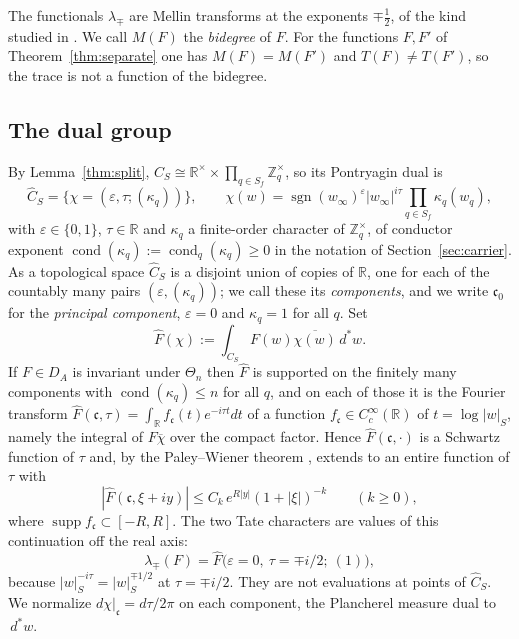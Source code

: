 \documentclass[11pt]{amsart}
\theoremstyle{definition}
\theoremstyle{remark}
\newcommand{\R}{\mathbb R}
\newcommand{\Z}{\mathbb Z}
\newcommand{\dstar}{\,d^{*}}
\newcommand{\supp}{\operatorname{supp}}
\newcommand{\sgn}{\operatorname{sgn}}
\newcommand{\Ch}{\widehat{C}_S}
\newcommand{\DA}{D_A}
\newcommand{\cond}{\operatorname{cond}}
\begin{document}
The functionals $\lambda_{\mp}$ are Mellin transforms at the exponents
$\mp\tfrac12$, of the kind studied in \cite{Tate}.  We call $M(F)$ the
\emph{bidegree} of $F$.  For the functions $F,F'$ of
Theorem~\ref{thm:separate} one has $M(F)=M(F')$ and $T(F)\ne T(F')$, so the
trace is not a function of the bidegree.

\subsection{The dual group}

By Lemma~\ref{thm:split}, $C_S\cong\R^{\times}\times\prod_{q\in
S_f}\Z_q^{\times}$, so its Pontryagin dual is
\begin{equation}\label{eq:dual}
\Ch=\bigl\{\chi=(\varepsilon,\tau;(\kappa_q))\bigr\},\qquad
\chi(w)=\sgn(w_{\infty})^{\varepsilon}|w_{\infty}|^{i\tau}
\prod_{q\in S_f}\kappa_q(w_q),
\end{equation}
with $\varepsilon\in\{0,1\}$, $\tau\in\R$ and $\kappa_q$ a finite-order
character of $\Z_q^{\times}$, of conductor exponent
$\cond(\kappa_q):=\cond_q(\kappa_q)\ge0$ in the notation of
Section~\ref{sec:carrier}.  As a topological space $\Ch$ is a disjoint union of copies of $\R$, one for each of
the countably many pairs $(\varepsilon,(\kappa_q))$; we call these its
\emph{components}, and we write $\mathfrak c_0$ for the \emph{principal
component}, $\varepsilon=0$ and $\kappa_q=1$ for all $q$.  Set
\begin{equation}\label{eq:FT}
\widehat F(\chi):=\int_{C_S}F(w)\overline{\chi(w)}\dstar w .
\end{equation}
If $F\in\DA$ is invariant under $\Theta_n$ then $\widehat F$ is supported on
the finitely many components with $\cond(\kappa_q)\le n$ for all $q$,
and on each of those it is the Fourier transform
$\widehat F(\mathfrak c,\tau)=\int_{\R}f_{\mathfrak c}(t)e^{-i\tau t}dt$ of a
function $f_{\mathfrak c}\in C_c^{\infty}(\R)$ of $t=\log|w|_S$, namely the
integral of $F\overline{\chi}$ over the compact factor.  Hence $\widehat
F(\mathfrak c,\cdot)$ is a Schwartz function of $\tau$ and, by the
Paley--Wiener theorem \cite[Theorem~7.3.1]{Hormander}, extends to an entire function
of $\tau$ with
\begin{equation}\label{eq:PW}
|\widehat F(\mathfrak c,\xi+iy)|\le C_k\,e^{R|y|}(1+|\xi|)^{-k}
\qquad(k\ge0),
\end{equation}
where $\supp f_{\mathfrak c}\subset[-R,R]$.  The two Tate characters are
values of this continuation off the real axis:
\begin{equation}\label{eq:lambdaFT}
\lambda_{\mp}(F)=\widehat F\bigl(\varepsilon=0,\ \tau=\mp i/2;\ (1)\bigr),
\end{equation}
because $|w|_S^{-i\tau}=|w|_S^{\mp1/2}$ at $\tau=\mp i/2$.  They are not
evaluations at points of $\Ch$.  We normalize
$d\chi|_{\mathfrak c}=d\tau/2\pi$ on each component, the Plancherel measure
dual to $\dstar w$.
\end{document}

